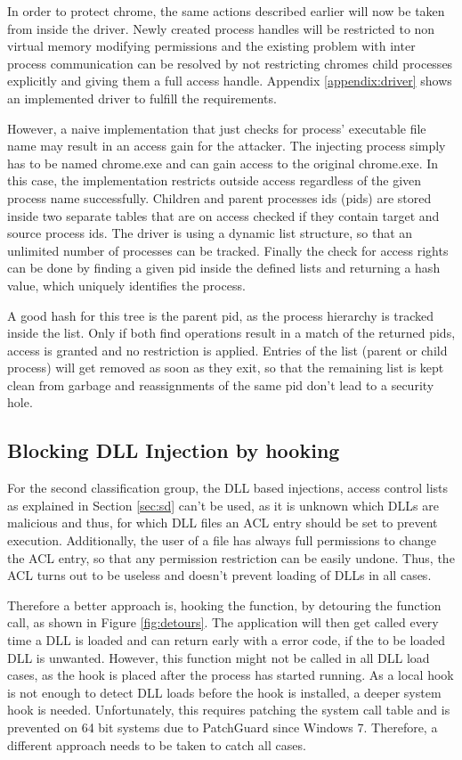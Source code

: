 In order to protect chrome, the same actions described earlier will now be taken from inside the driver. Newly created process handles will be restricted to non virtual memory modifying permissions and the existing problem with inter process communication can be resolved by not restricting chromes child processes explicitly and giving them a full access handle. Appendix \ref{appendix:driver} shows an implemented driver to fulfill the requirements.

However, a naive implementation that just checks for process' executable file name may result in an access gain for the attacker. The injecting process simply has to be named chrome.exe and can gain access to the original chrome.exe. In this case, the implementation restricts outside access regardless of the given process name successfully. Children and parent processes ids (pids) are stored inside two separate tables that are on access checked if they contain target and source process ids. The driver is using a dynamic list structure, so that an unlimited number of processes can be tracked. Finally the check for access rights can be done by finding a given pid inside the defined lists and returning a hash value, which uniquely identifies the process. 

A good hash for this tree is the parent pid, as the process hierarchy is tracked inside the list. Only if both find operations result in a match of the returned pids, access is granted and no restriction is applied. Entries of the list (parent or child process) will get removed as soon as they exit, so that the remaining list is kept clean from garbage and reassignments of the same pid don't lead to a security hole. 

\subsection{Blocking DLL Injection by hooking }
For the second classification group, the DLL based injections, access control lists as explained in Section \ref{sec:sd} can't be used, as it is unknown which DLLs are malicious and thus, for which DLL files an ACL entry should be set to prevent execution. Additionally, the user of a file has always full permissions to change the ACL entry, so that any permission restriction can be easily undone. Thus, the ACL turns out to be useless and doesn't prevent loading of DLLs in all cases. 

Therefore a better approach is, hooking the  function, by detouring the function call, as shown in Figure \ref{fig:detours}. The application will then get called every time a DLL is loaded and can return early with a  error code, if the to be loaded DLL is unwanted. However, this function might not be called in all DLL load cases, as the hook is placed after the process has started running. As a local hook is not enough to detect DLL loads before the hook is installed, a deeper system hook is needed. Unfortunately, this requires patching the system call table and is prevented on 64 bit systems due to PatchGuard since Windows 7. Therefore, a different approach needs to be taken to catch all cases.

